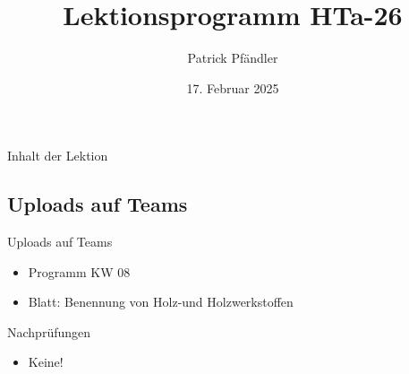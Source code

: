 

\def\customoptions{aspectratio=169} %



\title{\textbf{Lektionsprogramm HTa-26}}
\author{Patrick Pfändler}
\date{17. Februar 2025}



\frame{\titlepage}


\begin{frame}{Inhalt der Lektion}
	\tableofcontents
\end{frame}

\subsection{Uploads auf Teams}
\begin{frame}{Uploads auf Teams}
	\begin{itemize}
		\item[\textbullet] Programm KW 08
		\item[\textbullet] Blatt: Benennung von Holz-und Holzwerkstoffen
	\end{itemize}

\end{frame}

\begin{frame}{Nachprüfungen}
	\begin{itemize}
		\item Keine!
	\end{itemize}

\end{frame}



